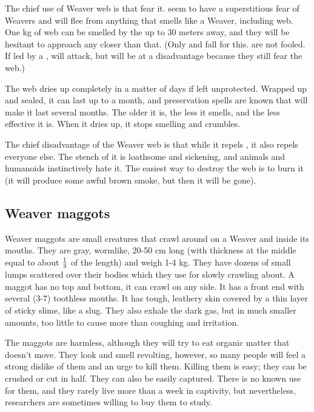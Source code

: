The chief use of Weaver web is that \banes{} fear it. \Banes{} seem to have a superstitious fear of Weavers and will flee from anything that smells like a Weaver, including web. One kg of web can be smelled by the \banes{} up to 30 meters away, and they will be hesitant to approach any closer than that. (Only \banespawn{} and \lesserbanes{} fall for this. \Banelords{} are not fooled. If led by a \banelord{}, \lesserbanes{} will attack, but will be at a disadvantage because they still fear the web.) 

The web dries up completely in a matter of days if left unprotected. Wrapped up and sealed, it can last up to a month, and preservation spells are known that will make it last several months. The older it is, the less it smells, and the less effective it is. When it dries up, it stops smelling and crumbles. 

The chief disadvantage of the Weaver web is that while it repels \banes{}, it also repels everyone else. The stench of it is loathsome and sickening, and animals and humanoids instinctively hate it. The easiest way to destroy the web is to burn it (it will produce some awful brown smoke, but then it will be gone).









\subsection{Weaver maggots}
Weaver maggots are small creatures that crawl around on a Weaver and inside its mouths. They are gray, wormlike, 20-50 cm long (with thickness at the middle equal to about $\textstyle{\frac{1}{3}}$ of the length) and weigh 1-4 kg. They have dozens of small lumps scattered over their bodies which they use for slowly crawling about. A maggot has no top and bottom, it can crawl on any side. It has a front end with several (3-7) toothless mouths. It has tough, leathery skin covered by a thin layer of sticky slime, like a slug. They also exhale the dark gas, but in much smaller amounts, too little to cause more than coughing and irritation. 

The maggots are harmless, although they will try to eat organic matter that doesn't move. They look and smell revolting, however, so many people will feel a strong dislike of them and an urge to kill them. Killing them is easy; they can be crushed or cut in half. They can also be easily captured. There is no known use for them, and they rarely live more than a week in captivity, but nevertheless, researchers are sometimes willing to buy them to study. 

